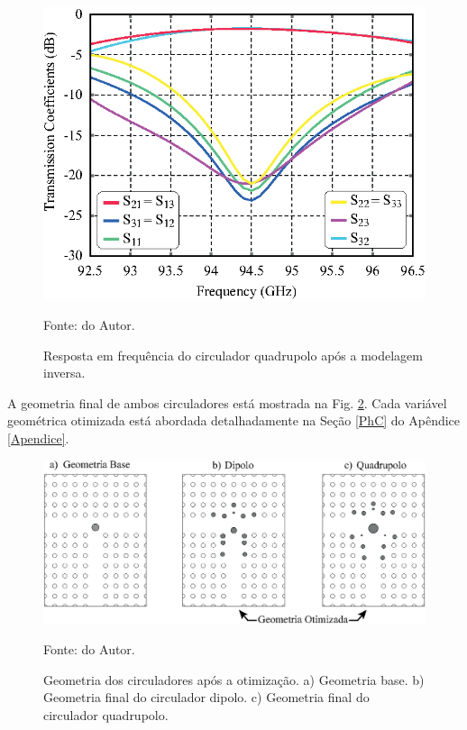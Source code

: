 \begin{figure}[H]
	\centering\includegraphics{04-Figuras/QuadrupoleOptimization.eps}
	\caption{Resposta em frequência do circulador quadrupolo após a modelagem inversa.}
    Fonte: do Autor.
	\label{fig: QuadrupoleOptimization}
\end{figure}

A geometria final de ambos circuladores está mostrada na Fig. \ref{fig: PhCGeometryOptimization}. Cada variável geométrica otimizada está abordada detalhadamente na Seção \ref{PhC} do Apêndice \ref{Apendice}.

\begin{figure}[H]
    \centering
    \includegraphics{04-Figuras/PhCGeometryOptimization.eps}
    \caption{Geometria dos circuladores após a otimização. a) Geometria base. b) Geometria final do circulador dipolo. c) Geometria final do circulador quadrupolo.} \par
    Fonte: do Autor.
    \label{fig: PhCGeometryOptimization}
\end{figure}

